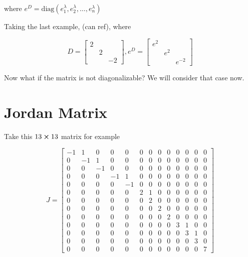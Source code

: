 where $e^D = \mathrm{diag}(e^\lambda_1, e^\lambda_2, \ldots, e^\lambda_n)$

\begin{example}
	Taking the last example, (can ref), where

	\[D = \begin{bmatrix}
		2&&\\&2&\\&&-2
	\end{bmatrix}, e^D = \begin{bmatrix}
		e^2&&\\&e^2&\\&&e^{-2}
	\end{bmatrix}\]
\end{example}

Now what if the matrix is not diagonalizable? We will consider that case now.

\section{Jordan Matrix}

Take this $13 \cross 13$ matrix for example

\[J = \left[
	\begin{array}{ccc|cc|cc|c|c|ccc|c}
		-1 & 1 & 0 & 0 & 0 & 0 & 0 & 0 & 0 & 0 & 0 & 0 & 0 \\
		0 & -1 & 1 & 0 & 0 & 0 & 0 & 0 & 0 & 0 & 0 & 0 & 0 \\
		0 & 0 & -1 & 0 & 0 & 0 & 0 & 0 & 0 & 0 & 0 & 0 & 0 \\ \hline
		0 & 0 & 0 & -1 & 1 & 0 & 0 & 0 & 0 & 0 & 0 & 0 & 0 \\
		0 & 0 & 0 & 0 & -1 & 0 & 0 & 0 & 0 & 0 & 0 & 0 & 0 \\ \hline
		0 & 0 & 0 & 0 & 0 & 2 & 1 & 0 & 0 & 0 & 0 & 0 & 0 \\
		0 & 0 & 0 & 0 & 0 & 0 & 2 & 0 & 0 & 0 & 0 & 0 & 0 \\ \hline
		0 & 0 & 0 & 0 & 0 & 0 & 0 & 2 & 0 & 0 & 0 & 0 & 0 \\ \hline
		0 & 0 & 0 & 0 & 0 & 0 & 0 & 0 & 2 & 0 & 0 & 0 & 0 \\ \hline
		0 & 0 & 0 & 0 & 0 & 0 & 0 & 0 & 0 & 3 & 1 & 0 & 0 \\
		0 & 0 & 0 & 0 & 0 & 0 & 0 & 0 & 0 & 0 & 3 & 1 & 0 \\
		0 & 0 & 0 & 0 & 0 & 0 & 0 & 0 & 0 & 0 & 0 & 3 & 0 \\ \hline
		0 & 0 & 0 & 0 & 0 & 0 & 0 & 0 & 0 & 0 & 0 & 0 & 7
	\end{array}
\right]\]

